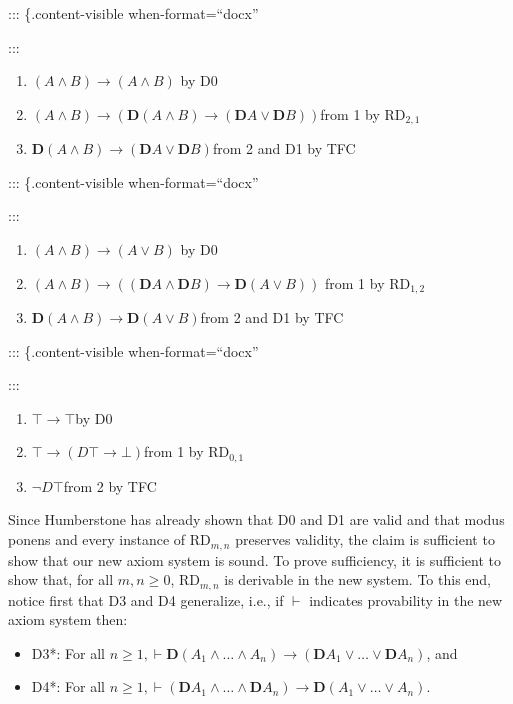 \documentclass[
  11pt,
  letterpaper,
  DIV=11,
  numbers=noendperiod,
  twoside]{scrartcl}
\providecommand{\tightlist}{%
  \setlength{\itemsep}{0pt}\setlength{\parskip}{0pt}}\usepackage{longtable,booktabs,array}
\begin{document}
::: \{.content-visible when-format=``docx''

:::

\begin{enumerate}
\def\labelenumi{\arabic{enumi}.}
\tightlist
\item
  \((A\wedge B)\rightarrow (A\wedge B)\) by D0
\item
  \((A\wedge B)\rightarrow (\mathbf{D}(A\wedge B)\rightarrow (\mathbf{D}A\vee \mathbf{D}B))\)from
  1 by RD\(_{2,1}\)
\item
  \(\mathbf{D}(A\wedge B)\rightarrow (\mathbf{D}A\vee \mathbf{D}B)\)from
  2 and D1 by TFC
\end{enumerate}

::: \{.content-visible when-format=``docx''

:::

\begin{enumerate}
\def\labelenumi{\arabic{enumi}.}
\tightlist
\item
  \((A\wedge B)\rightarrow (A\vee B)\) by D0
\item
  \((A\wedge B)\rightarrow ((\mathbf{D}A\wedge \mathbf{D}B)\rightarrow \mathbf{D}(A\vee B))\)
  from 1 by RD\(_{1,2}\)
\item
  \(\mathbf{D}(A\wedge B)\rightarrow \mathbf{D}(A\vee B)\)from 2 and D1
  by TFC
\end{enumerate}

::: \{.content-visible when-format=``docx''

:::

\begin{enumerate}
\def\labelenumi{\arabic{enumi}.}
\tightlist
\item
  \(\top \rightarrow \top\)by D0
\item
  \(\top \rightarrow (D\top \rightarrow \bot)\)from 1 by RD\(_{0,1}\)
\item
  \(\neg D\top\)from 2 by TFC
\end{enumerate}

Since Humberstone has already shown that D0 and D1 are valid and that
modus ponens and every instance of RD\(_{m,n}\) preserves validity, the
claim is sufficient to show that our new axiom system is sound. To prove
sufficiency, it is sufficient to show that, for all \(m,n\!\ge\!0\),
RD\(_{m,n}\) is derivable in the new system. To this end, notice first
that D3 and D4 generalize, i.e., if \(\vdash\) indicates provability in
the new axiom system then:

\begin{itemize}
\tightlist
\item
  D3*: For all
  \(n{\ge}1, \vdash \mathbf{D}(A_1\wedge {\ldots}\wedge A_n) \rightarrow (\mathbf{D}A_1\vee {\ldots}\vee \mathbf{D}A_n)\),
  and
\item
  D4*: For all
  \(n{\ge}1, \vdash (\mathbf{D}A_1\wedge {\ldots}\wedge \mathbf{D}A_n) \rightarrow \mathbf{D}(A_1\vee {\ldots}\vee A_n)\).
\end{itemize}
\end{document}
